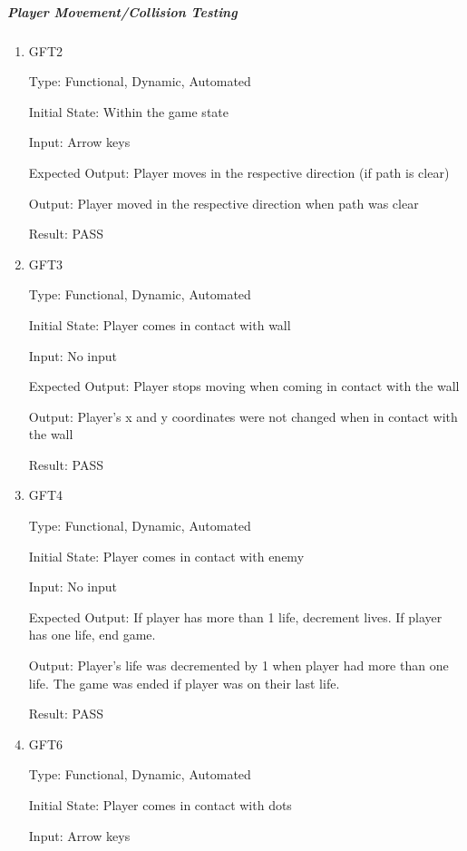 \documentclass[12pt, titlepage]{article}
\begin{document}
\subparagraph{Player Movement/Collision Testing}

\begin{enumerate}

\item{GFT2\\}

Type: Functional, Dynamic, Automated
					
Initial State: Within the game state
					
Input: Arrow keys
					
Expected Output: Player moves in the respective direction (if path is clear)

Output: Player moved in the respective direction when path was clear
					
Result: PASS

\item{GFT3\\}

Type: Functional, Dynamic, Automated
					
Initial State: Player comes in contact with wall
					
Input: No input
					
Expected Output: Player stops moving when coming in contact with the wall

Output: Player's x and y coordinates were not changed when in contact with the wall

Result: PASS

\item{GFT4\\}

Type: Functional, Dynamic, Automated
					
Initial State: Player comes in contact with enemy
					
Input: No input
					
Expected Output: If player has more than 1 life, decrement lives. If player has one life, end game.

Output: Player's life was decremented by 1 when player had more than one life. The game was ended if player was on their last life.

Result: PASS

\item{GFT6\\}

Type: Functional, Dynamic, Automated
					
Initial State: Player comes in contact with dots
					
Input: Arrow keys
					

\end{enumerate}
\end{document}
